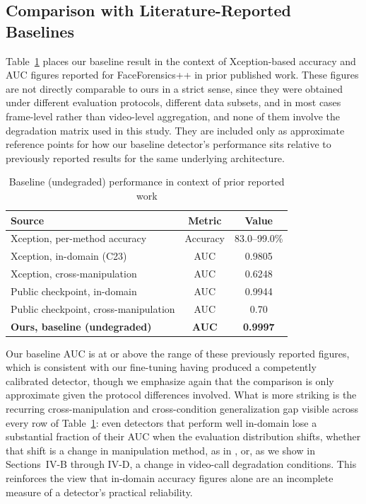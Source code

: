 \documentclass[conference]{IEEEtran}
\begin{document}
\subsection{Comparison with Literature-Reported Baselines}
Table~\ref{tab:literature} places our baseline result in the context of Xception-based accuracy and AUC figures reported for FaceForensics++ in prior published work. These figures are not directly comparable to ours in a strict sense, since they were obtained under different evaluation protocols, different data subsets, and in most cases frame-level rather than video-level aggregation, and none of them involve the degradation matrix used in this study. They are included only as approximate reference points for how our baseline detector's performance sits relative to previously reported results for the same underlying architecture.

\begin{table}[htbp]
\caption{Baseline (undegraded) performance in context of prior reported work}
\label{tab:literature}
\centering
\begin{tabular}{@{}lcc@{}}
\toprule
\textbf{Source} & \textbf{Metric} & \textbf{Value} \\
\midrule
Xception, per-method accuracy \cite{faketransformer2021} & Accuracy & 83.0--99.0\% \\
Xception, in-domain (C23) \cite{lightweightfusion2026} & AUC & 0.9805 \\
Xception, cross-manipulation \cite{lightweightfusion2026} & AUC & 0.6248 \\
Public checkpoint, in-domain \cite{mumairab2026} & AUC & 0.9944 \\
Public checkpoint, cross-manipulation \cite{mumairab2026} & AUC & 0.70 \\
\textbf{Ours, baseline (undegraded)} & \textbf{AUC} & \textbf{0.9997} \\
\bottomrule
\end{tabular}
\end{table}

Our baseline AUC is at or above the range of these previously reported figures, which is consistent with our fine-tuning having produced a competently calibrated detector, though we emphasize again that the comparison is only approximate given the protocol differences involved. What is more striking is the recurring cross-manipulation and cross-condition generalization gap visible across every row of Table~\ref{tab:literature}: even detectors that perform well in-domain lose a substantial fraction of their AUC when the evaluation distribution shifts, whether that shift is a change in manipulation method, as in \cite{lightweightfusion2026,mumairab2026}, or, as we show in Sections~IV-B through IV-D, a change in video-call degradation conditions. This reinforces the view that in-domain accuracy figures alone are an incomplete measure of a detector's practical reliability.
\end{document}
